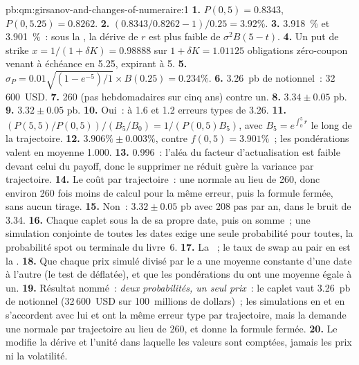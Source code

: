 \begin{solution}{pb:qm:girsanov-and-changes-of-numeraire:1}
\textbf{1.} $P(0,5) = 0.8343$, $P(0,5.25) = 0.8262$.
\textbf{2.} $(0.8343/0.8262 - 1)/0.25 = 3.92\%$.
\textbf{3.} 3.918~\% et 3.901~\%~: sous la , la dérive de $r$ est plus faible de $\sigma^2B(5 - t)$.
\textbf{4.} Un put de strike $x = 1/(1 + \delta K) = 0.98888$ sur $1 + \delta K = 1.01125$ obligations zéro-coupon venant à échéance
en 5.25, expirant à 5.
\textbf{5.} $\sigma_P = 0.01\sqrt{(1 - e^{-5})/1}\times B(0.25) = 0.234\%$.
\textbf{6.} 3.26~pb de notionnel~: 32\,600~USD.
\textbf{7.} 260 (pas hebdomadaires sur cinq ans) contre un.
\textbf{8.} $3.34 \pm 0.05$ pb.
\textbf{9.} $3.32 \pm 0.05$ pb.
\textbf{10.} Oui~: à 1.6 et 1.2 erreurs types de 3.26.
\textbf{11.} $(P(5,5)/P(0,5))/(B_5/B_0) = 1/(P(0,5)B_5)$, avec $B_5 = e^{\int_0^5r}$ le long de la trajectoire.
\textbf{12.} $3.906\% \pm 0.003\%$, contre $f(0,5) = 3.901\%$~; les pondérations valent en moyenne 1.000.
\textbf{13.} 0.996~: l'aléa du facteur d'actualisation est faible devant celui du payoff, donc le supprimer
ne réduit guère la variance par trajectoire.
\textbf{14.} Le coût par trajectoire~: une normale au lieu de 260, donc environ 260 fois moins de calcul pour la même
erreur, puis la formule fermée, sans aucun tirage.
\textbf{15.} Non~: $3.32 \pm 0.05$ pb avec 208 pas par an, dans le bruit de 3.34.
\textbf{16.} Chaque caplet sous la  de sa propre date, puis on somme~; une simulation conjointe de toutes
les dates exige une seule probabilité pour toutes, la probabilité spot ou terminale du livre~6.
\textbf{17.} La ~; le taux de swap au pair en est la .
\textbf{18.} Que chaque prix simulé divisé par le  a une moyenne constante d'une date à l'autre (le
test de  déflatée), et que les pondérations du  ont une moyenne égale à un.
\textbf{19.} Résultat nommé~: \emph{deux probabilités, un seul prix}~: le caplet vaut 3.26~pb de notionnel
(32\,600~USD sur 100~millions de dollars)~; les simulations en  et en  s'accordent avec lui et ont
la même erreur type par trajectoire, mais la  demande une normale par trajectoire au lieu de 260,
et donne la formule fermée.
\textbf{20.} Le  modifie la dérive et l'unité dans laquelle les valeurs sont comptées, jamais les prix ni
la volatilité.
\end{solution}

